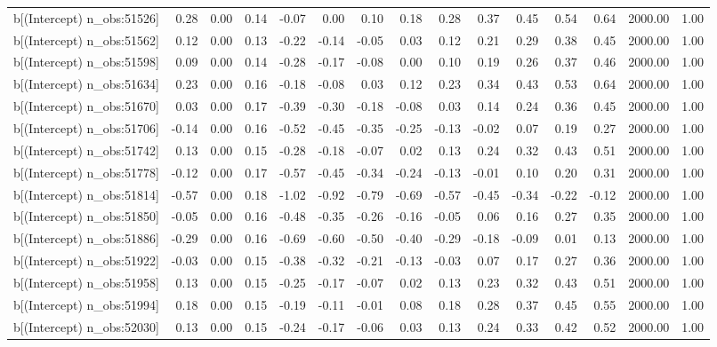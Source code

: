 \begin{table}[ht]
\begin{tabular}{rrrrrrrrrrrrrrr}
  b[(Intercept) n\_obs:51526] & 0.28 & 0.00 & 0.14 & -0.07 & 0.00 & 0.10 & 0.18 & 0.28 & 0.37 & 0.45 & 0.54 & 0.64 & 2000.00 & 1.00 \\ 
  b[(Intercept) n\_obs:51562] & 0.12 & 0.00 & 0.13 & -0.22 & -0.14 & -0.05 & 0.03 & 0.12 & 0.21 & 0.29 & 0.38 & 0.45 & 2000.00 & 1.00 \\ 
  b[(Intercept) n\_obs:51598] & 0.09 & 0.00 & 0.14 & -0.28 & -0.17 & -0.08 & 0.00 & 0.10 & 0.19 & 0.26 & 0.37 & 0.46 & 2000.00 & 1.00 \\ 
  b[(Intercept) n\_obs:51634] & 0.23 & 0.00 & 0.16 & -0.18 & -0.08 & 0.03 & 0.12 & 0.23 & 0.34 & 0.43 & 0.53 & 0.64 & 2000.00 & 1.00 \\ 
  b[(Intercept) n\_obs:51670] & 0.03 & 0.00 & 0.17 & -0.39 & -0.30 & -0.18 & -0.08 & 0.03 & 0.14 & 0.24 & 0.36 & 0.45 & 2000.00 & 1.00 \\ 
  b[(Intercept) n\_obs:51706] & -0.14 & 0.00 & 0.16 & -0.52 & -0.45 & -0.35 & -0.25 & -0.13 & -0.02 & 0.07 & 0.19 & 0.27 & 2000.00 & 1.00 \\ 
  b[(Intercept) n\_obs:51742] & 0.13 & 0.00 & 0.15 & -0.28 & -0.18 & -0.07 & 0.02 & 0.13 & 0.24 & 0.32 & 0.43 & 0.51 & 2000.00 & 1.00 \\ 
  b[(Intercept) n\_obs:51778] & -0.12 & 0.00 & 0.17 & -0.57 & -0.45 & -0.34 & -0.24 & -0.13 & -0.01 & 0.10 & 0.20 & 0.31 & 2000.00 & 1.00 \\ 
  b[(Intercept) n\_obs:51814] & -0.57 & 0.00 & 0.18 & -1.02 & -0.92 & -0.79 & -0.69 & -0.57 & -0.45 & -0.34 & -0.22 & -0.12 & 2000.00 & 1.00 \\ 
  b[(Intercept) n\_obs:51850] & -0.05 & 0.00 & 0.16 & -0.48 & -0.35 & -0.26 & -0.16 & -0.05 & 0.06 & 0.16 & 0.27 & 0.35 & 2000.00 & 1.00 \\ 
  b[(Intercept) n\_obs:51886] & -0.29 & 0.00 & 0.16 & -0.69 & -0.60 & -0.50 & -0.40 & -0.29 & -0.18 & -0.09 & 0.01 & 0.13 & 2000.00 & 1.00 \\ 
  b[(Intercept) n\_obs:51922] & -0.03 & 0.00 & 0.15 & -0.38 & -0.32 & -0.21 & -0.13 & -0.03 & 0.07 & 0.17 & 0.27 & 0.36 & 2000.00 & 1.00 \\ 
  b[(Intercept) n\_obs:51958] & 0.13 & 0.00 & 0.15 & -0.25 & -0.17 & -0.07 & 0.02 & 0.13 & 0.23 & 0.32 & 0.43 & 0.51 & 2000.00 & 1.00 \\ 
  b[(Intercept) n\_obs:51994] & 0.18 & 0.00 & 0.15 & -0.19 & -0.11 & -0.01 & 0.08 & 0.18 & 0.28 & 0.37 & 0.45 & 0.55 & 2000.00 & 1.00 \\ 
  b[(Intercept) n\_obs:52030] & 0.13 & 0.00 & 0.15 & -0.24 & -0.17 & -0.06 & 0.03 & 0.13 & 0.24 & 0.33 & 0.42 & 0.52 & 2000.00 & 1.00 \\ 

\end{tabular}
\end{table}
